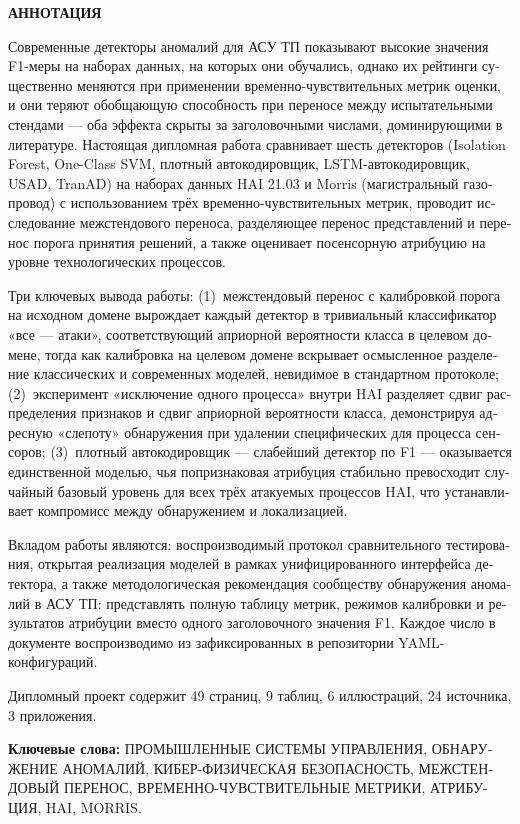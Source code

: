 \begin{russian}
\thispagestyle{empty}
\begin{center}
{\Large \textbf{АННОТАЦИЯ}\par}
\end{center}
\vspace{0.5cm}

Современные детекторы аномалий для АСУ ТП показывают высокие значения F1-меры на наборах данных, на которых они обучались, однако их рейтинги существенно меняются при применении временно-чувствительных метрик оценки, и они теряют обобщающую способность при переносе между испытательными стендами --- оба эффекта скрыты за заголовочными числами, доминирующими в литературе.  Настоящая дипломная работа сравнивает шесть детекторов (Isolation Forest, One-Class SVM, плотный автокодировщик, LSTM-автокодировщик, USAD, TranAD) на наборах данных HAI 21.03 и Morris (магистральный газопровод) с использованием трёх временно-чувствительных метрик, проводит исследование межстендового переноса, разделяющее перенос представлений и перенос порога принятия решений, а также оценивает посенсорную атрибуцию на уровне технологических процессов.

Три ключевых вывода работы: (1)~межстендовый перенос с калибровкой порога на исходном домене вырождает каждый детектор в тривиальный классификатор «все --- атаки», соответствующий априорной вероятности класса в целевом домене, тогда как калибровка на целевом домене вскрывает осмысленное разделение классических и современных моделей, невидимое в стандартном протоколе; (2)~эксперимент «исключение одного процесса» внутри HAI разделяет сдвиг распределения признаков и сдвиг априорной вероятности класса, демонстрируя адресную «слепоту» обнаружения при удалении специфических для процесса сенсоров; (3)~плотный автокодировщик --- слабейший детектор по F1 --- оказывается единственной моделью, чья попризнаковая атрибуция стабильно превосходит случайный базовый уровень для всех трёх атакуемых процессов HAI, что устанавливает компромисс между обнаружением и локализацией.

Вкладом работы являются: воспроизводимый протокол сравнительного тестирования, открытая реализация моделей в рамках унифицированного интерфейса детектора, а также методологическая рекомендация сообществу обнаружения аномалий в АСУ ТП: представлять полную таблицу метрик, режимов калибровки и результатов атрибуции вместо одного заголовочного значения F1.  Каждое число в документе воспроизводимо из зафиксированных в репозитории YAML-конфигураций.

\vspace{0.3cm}

Дипломный проект содержит 49 страниц, 9 таблиц, 6 иллюстраций, 24 источника, 3 приложения.

\vspace{0.3cm}
\noindent\textbf{Ключевые слова:} ПРОМЫШЛЕННЫЕ СИСТЕМЫ УПРАВЛЕНИЯ, ОБНАРУЖЕНИЕ АНОМАЛИЙ, КИБЕР-ФИЗИЧЕСКАЯ БЕЗОПАСНОСТЬ, МЕЖСТЕНДОВЫЙ ПЕРЕНОС, ВРЕМЕННО-ЧУВСТВИТЕЛЬНЫЕ МЕТРИКИ, АТРИБУЦИЯ, HAI, MORRIS.
\end{russian}
\newpage
